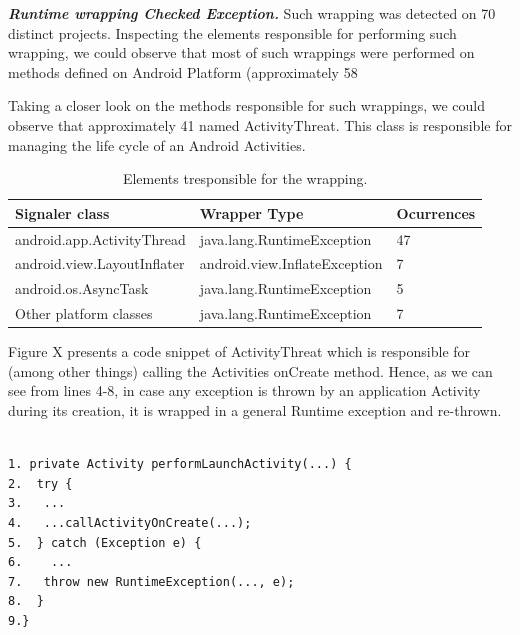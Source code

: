 \documentclass[conference]{IEEEtran}
\begin{document}
\emph{\textbf{Runtime wrapping Checked Exception.}} Such wrapping was 
detected on 70 distinct projects. Inspecting the 
elements responsible for performing such wrapping, we could observe that
most of such wrappings were performed on methods defined on Android
Platform (approximately 58%


Taking a closer look on the methods responsible for such wrappings,
 we could observe that approximately 41%
 named ActivityThreat. This class is responsible for managing the life cycle of an Android Activities. 

\begin{table}
\centering
\begin{tabular}{lll}
    \hline
 \bfseries{Signaler class} &  \bfseries{Wrapper Type} & \bfseries{Ocurrences} \\
    \hline
android.app.ActivityThread & java.lang.RuntimeException & 47 \\
android.view.LayoutInflater & android.view.InflateException &  7 \\
android.os.AsyncTask & java.lang.RuntimeException &  5 \\
Other platform classes & java.lang.RuntimeException &   7 \\
\hline
  \end{tabular}
\caption{Elements tresponsible for the wrapping.}
\label{tab:wrapping01}
\end{table}

Figure X presents a code snippet of ActivityThreat which is responsible for (among other things)
calling the Activities onCreate method. Hence, as we can see from lines 4-8,
 in case any exception is thrown by an application Activity during its creation, 
it is wrapped in a general Runtime exception and re-thrown.

{\footnotesize
\begin{verbatim}

1. private Activity performLaunchActivity(...) {
2.  try {
3.   ...
4.   ...callActivityOnCreate(...);
5.  } catch (Exception e) {
6.    ...
7.   throw new RuntimeException(..., e);
8.  }
9.}
\end{verbatim}
}
\end{document}
